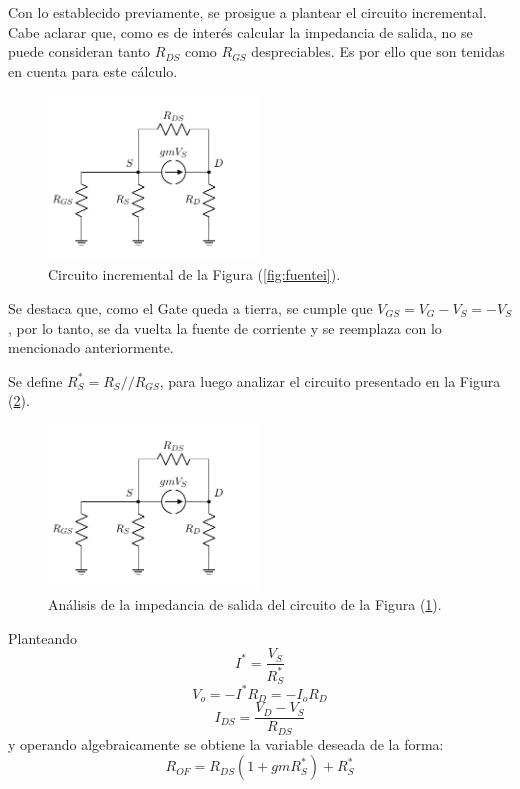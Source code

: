 Con lo establecido previamente, se prosigue a plantear el circuito incremental. Cabe aclarar que, como es de interés calcular la impedancia de salida, no se puede consideran tanto $R_{DS}$ como $R_{GS}$ despreciables. Es por ello que son tenidas en cuenta para este cálculo.
\begin{figure}[H]
\centering
	\includegraphics[width=0.5\textwidth, page=1]{Imagenes/ModeloIncremental.pdf}
	\caption{Circuito incremental de la Figura (\ref{fig:fuentei}).}
\label{fig:incfuente1}
\end{figure}

Se destaca que, como el Gate queda a tierra, se cumple que $V_{GS} = V_G - V_S = - V_S$, por lo tanto, se da vuelta la fuente de corriente y se reemplaza con lo mencionado anteriormente. 

Se define $R_S^* = R_S // R_{GS}$, para luego analizar el circuito presentado en la Figura (\ref{fig:incfuente2}).
\begin{figure}[H]
\centering
	\includegraphics[width=0.5\textwidth, page=2]{Imagenes/ModeloIncremental.pdf}
	\caption{Análisis de la impedancia de salida del circuito de la Figura (\ref{fig:incfuente1}).}
\label{fig:incfuente2}
\end{figure}

Planteando
\begin{equation*}
	I^* = \frac{V_S}{R_S^*}
\end{equation*}
\begin{equation*}
	V_o = -I^* R_D = -I_o R_D
\end{equation*}
\begin{equation*}
	I_{DS} = \frac{V_D - V_S}{R_{DS}}
\end{equation*}
y operando algebraicamente se obtiene la variable deseada de la forma:
\begin{equation}
	R_{OF} = R_{DS} \left( 1 + gm R_S^* \right) + R_S^*
\end{equation}

